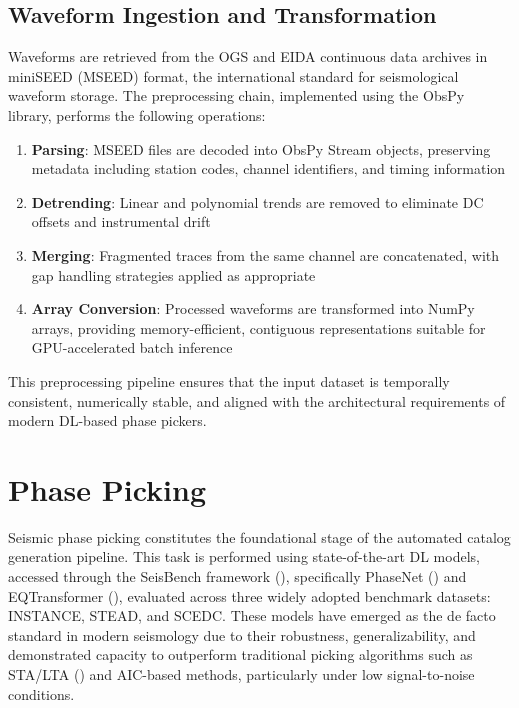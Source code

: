 \subsection{Waveform Ingestion and Transformation}
Waveforms are retrieved from the OGS and EIDA continuous data
archives in miniSEED
(MSEED) format, the international standard for seismological waveform storage.
The preprocessing chain, implemented using the ObsPy library, performs the
following operations:
\begin{enumerate}
  \item \textbf{Parsing}: MSEED files are decoded into ObsPy Stream objects,
    preserving metadata including station codes, channel
    identifiers, and timing
    information
  \item \textbf{Detrending}: Linear and polynomial trends are removed to
    eliminate DC offsets and instrumental drift
  \item \textbf{Merging}: Fragmented traces from the same channel are
    concatenated, with gap handling strategies applied as appropriate
  \item \textbf{Array Conversion}: Processed waveforms are transformed into
    NumPy arrays, providing memory-efficient, contiguous representations
    suitable for GPU-accelerated batch inference
\end{enumerate}

This preprocessing pipeline ensures that the input dataset is temporally
consistent, numerically stable, and aligned with the architectural requirements
of modern \ac{DL}-based phase pickers.

\section{Phase Picking}

Seismic phase picking constitutes the foundational stage of the automated
catalog generation pipeline. This task is performed using state-of-the-art
\ac{DL} models, accessed through the SeisBench framework (\cite{SeisBench}),
specifically PhaseNet (\cite{PhaseNet}) and EQTransformer
(\cite{EQTransformer}), evaluated across
three widely adopted benchmark datasets: INSTANCE, STEAD, and SCEDC. These
models have emerged as the de facto standard in modern seismology due to their
robustness, generalizability, and demonstrated capacity to outperform
traditional picking algorithms such as \ac{STA/LTA} (\cite{STALTA}) and
AIC-based methods, particularly under low signal-to-noise conditions.

